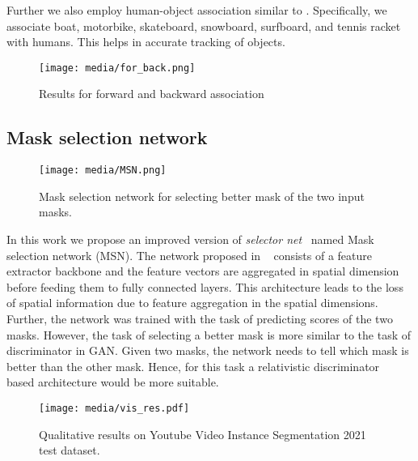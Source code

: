 \documentclass[final]{cvpr}
\begin{document}
Further we also employ human-object association similar to \cite{yang2019video}. Specifically, we associate boat, motorbike, skateboard, snowboard, surfboard, and tennis racket  with humans. This helps in accurate tracking of objects.


\begin{figure}
\centering
\texttt{[image: media/for\_back.png]}\hspace{10mm}
\vspace{-0.5cm}
\caption{Results for forward and backward association}
\label{fig:forback}
\end{figure}

\subsection{Mask selection network}
\label{sn}

\begin{figure}
\centering
\texttt{[image: media/MSN.png]}\hspace{10mm}
\vspace{-0.5cm}
\caption{Mask selection network  for selecting better mask of the two input masks.}
\label{fig:sn}
\end{figure}


In this work we propose an improved version of \textit{selector net}~\cite{garg2021mask} named Mask selection network (MSN). The network proposed in ~\cite{garg2021mask} consists of a feature extractor backbone and the feature vectors are aggregated in spatial dimension before feeding them to fully connected layers. This architecture leads to the loss of spatial information due to feature aggregation in the spatial dimensions. Further, the network was trained with the task of predicting scores of the two masks. However, the task of selecting a better mask is more similar to the task of discriminator in GAN. Given two masks, the network needs to tell which mask is better than the other mask. Hence, for this task a relativistic discriminator~\cite{wang2018esrgan} based architecture would be more suitable.

\begin{figure*}
\begin{center}
\texttt{[image: media/vis\_res.pdf]}
\end{center}
   \vspace{-1cm}
   \caption{Qualitative results on Youtube Video Instance Segmentation 2021 test dataset.}
\label{fig:2}
\end{figure*}
\end{document}
